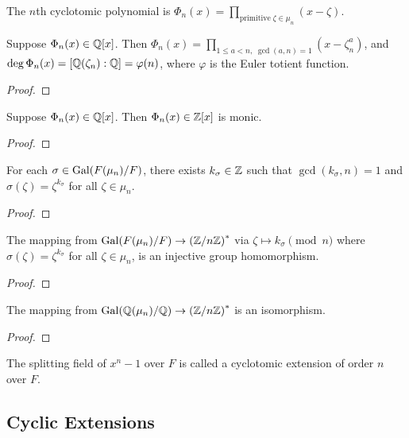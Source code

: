 \begin{definition}
    The \(n\)th cyclotomic polynomial is
    \(\Phi_n(x) = \prod_{\text{primitive}\;\zeta\in\mu_n} (x-\zeta)\).
\end{definition}
\begin{proposition}
    Suppose \(\Phi_n(x) \in \mathbb{Q}[x]\).
    Then \(\Phi_n(x)  = \prod_{1 \leq a < n,\; \gcd(a,n) = 1} (x-\zeta_n^a)\),
    and \(\deg \Phi_n(x) = [\mathbb{Q}(\zeta_n):\mathbb{Q}] = \varphi(n)\),
    where \(\varphi\) is the Euler totient function.
\end{proposition}
\begin{proof}
\end{proof}
\begin{proposition}
    Suppose \(\Phi_n(x) \in \mathbb{Q}[x]\).
    Then \(\Phi_n(x) \in \mathbb{Z}[x]\) is monic.
\end{proposition}
\begin{proof}
\end{proof}

\begin{lemma}
    For each \(\sigma \in \operatorname{Gal}(F(\mu_n)/F)\),
    there exists \(k_\sigma \in \mathbb{Z}\) such that \(\gcd(k_\sigma,n) = 1\)
    and \(\sigma(\zeta) = \zeta^{k_\sigma}\) for all \(\zeta \in \mu_n\).
\end{lemma}
\begin{proof}
\end{proof}
\begin{theorem}
    The mapping from \(\operatorname{Gal}(F(\mu_n)/F) \to {(\mathbb{Z}/n\mathbb{Z})}^\ast\)
    via \(\zeta \mapsto k_\sigma \pmod{n}\)
    where \(\sigma(\zeta) = \zeta^{k_\sigma}\) for all \(\zeta \in \mu_n\),
    is an injective group homomorphism.
\end{theorem}
\begin{proof}
\end{proof}
\begin{theorem}
    The mapping from \(\operatorname{Gal}(\mathbb{Q}(\mu_n)/\mathbb{Q}) \to {(\mathbb{Z}/n\mathbb{Z})}^\ast\)
    is an isomorphism.
\end{theorem}
\begin{proof}
\end{proof}

\begin{definition}
    The splitting field of \(x^n - 1\) over \(F\)
    is called a cyclotomic extension of order \(n\) over \(F\).
\end{definition}


\subsection*{Cyclic Extensions}

